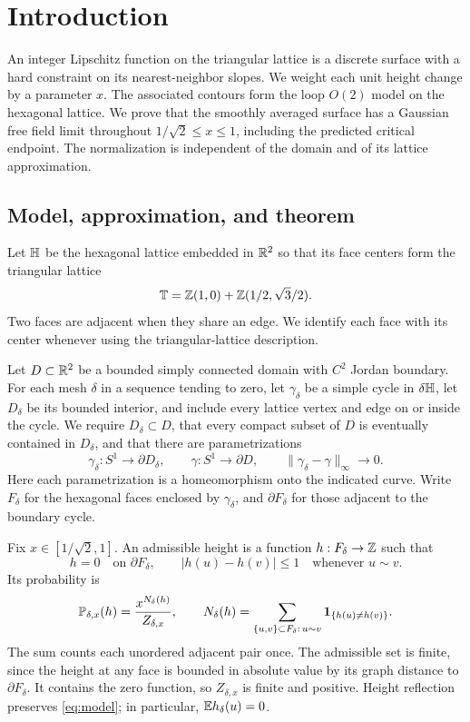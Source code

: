 \section{Introduction}\label{sec:introduction}

An integer Lipschitz function on the triangular lattice is a discrete
surface with a hard constraint on its nearest-neighbor slopes.  We weight
each unit height change by a parameter $x$.  The associated contours form
the loop $O(2)$ model on the hexagonal lattice.  We prove that the smoothly
averaged surface has a Gaussian free field limit throughout
$1/\sqrt2\le x\le1$, including the predicted critical endpoint.  The
normalization is independent of the domain and of its lattice approximation.

\subsection{Model, approximation, and theorem}

Let $\mathbb H$ be the hexagonal lattice embedded in $\mathbb R^2$ so that its face
centers form the triangular lattice
\[
 \mathbb T=\mathbb Z(1,0)+\mathbb Z(1/2,\sqrt3/2).
\]
Two faces are adjacent when they share an edge.  We identify each face with
its center whenever using the triangular-lattice description.

\begin{definition}\label{def:approximation}
Let $D\subset\mathbb R^2$ be a bounded simply connected domain with $C^2$ Jordan
boundary.  For each mesh $\delta$ in a sequence tending to zero, let
$\gamma_\delta$ be a simple cycle in $\delta\mathbb H$, let $D_\delta$ be its
bounded interior, and include every lattice vertex and edge on or inside
the cycle.  We require $D_\delta\subset D$, that every compact subset of
$D$ is eventually contained in $D_\delta$, and that there are
parametrizations
\[
 \gamma_\delta:S^1\longrightarrow\partial D_\delta,
 \qquad \gamma:S^1\longrightarrow\partial D,
 \qquad \|\gamma_\delta-\gamma\|_\infty\longrightarrow0.
\]
Here each parametrization is a homeomorphism onto the indicated curve.
Write $F_\delta$ for the hexagonal faces enclosed by $\gamma_\delta$, and
$\partial F_\delta$ for those adjacent to the boundary cycle.
\end{definition}

Fix $x\in[1/\sqrt2,1]$.  An admissible height is a function
$h:F_\delta\to\mathbb Z$ such that
\[
 h=0\quad\text{on }\partial F_\delta,
 \qquad |h(u)-h(v)|\le1\quad\text{whenever }u\sim v.
\]
Its probability is
\begin{equation}\label{eq:model}
 \mathbb P_{\delta,x}(h)=\frac{x^{N_\delta(h)}}{Z_{\delta,x}},
 \qquad
 N_\delta(h)=\sum_{\{u,v\}\subset F_\delta:\,u\sim v}
                 \mathbf 1_{\{h(u)\ne h(v)\}}.
\end{equation}
The sum counts each unordered adjacent pair once.  The admissible set is
finite, since the height at any face is bounded in absolute value by its
graph distance to $\partial F_\delta$.  It contains the zero function, so
$Z_{\delta,x}$ is finite and positive.  Height reflection preserves
\eqref{eq:model}; in particular, $\mathbb E h_\delta(u)=0$.

